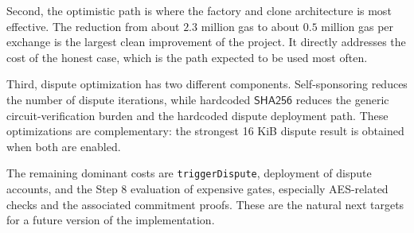 Second, the optimistic path is where the factory and clone architecture is most effective.
The reduction from about \(2.3\) million gas to about \(0.5\) million gas per exchange is
the largest clean improvement of the project. It directly addresses the cost of the honest
case, which is the path expected to be used most often.

Third, dispute optimization has two different components. Self-sponsoring reduces the
number of dispute iterations, while hardcoded \(\mathsf{SHA256}\) reduces the generic
circuit-verification burden and the hardcoded dispute deployment path. These optimizations
are complementary: the strongest 16 KiB dispute result is obtained when both are enabled.

The remaining dominant costs are \texttt{triggerDispute}, deployment of dispute accounts,
and the Step 8 evaluation of expensive gates, especially AES-related checks and the
associated commitment proofs. These are the natural next targets for a future version of
the implementation.
